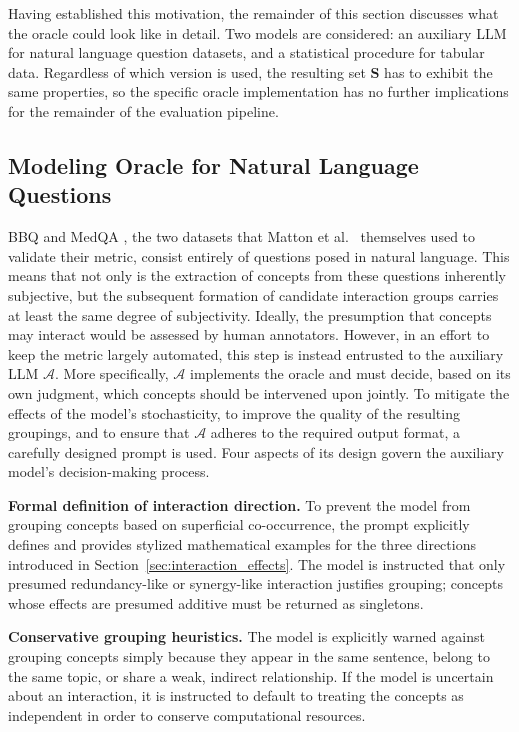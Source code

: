 Having established this motivation, the remainder of this section discusses what the oracle could look like in detail. Two models are considered: an auxiliary LLM for natural language question datasets, and a statistical procedure for tabular data. Regardless of which version is used, the resulting set $\mathbf{S}$ has to exhibit the same properties, so the specific oracle implementation has no further implications for the remainder of the evaluation pipeline.

\subsection{Modeling Oracle for Natural Language Questions}

BBQ \cite{parrishBBQHandbuiltBias2022} and MedQA \cite{jinWhatDiseaseDoes2021}, the two datasets that Matton et al.~\cite{mattonWalkTalkMeasuring2024} themselves used to validate their metric, consist entirely of questions posed in natural language. This means that not only is the extraction of concepts from these questions inherently subjective, but the subsequent formation of candidate interaction groups carries at least the same degree of subjectivity. Ideally, the presumption that concepts may interact would be assessed by human annotators. However, in an effort to keep the metric largely automated, this step is instead entrusted to the auxiliary LLM $\mathcal{A}$. More specifically, $\mathcal{A}$ implements the oracle and must decide, based on its own judgment, which concepts should be intervened upon jointly. To mitigate the effects of the model's stochasticity, to improve the quality of the resulting groupings, and to ensure that $\mathcal{A}$ adheres to the required output format, a carefully designed prompt is used. Four aspects of its design govern the auxiliary model's decision-making process.

\noindent\textbf{Formal definition of interaction direction.} To prevent the model from grouping concepts based on superficial co-occurrence, the prompt explicitly defines and provides stylized mathematical examples for the three directions introduced in Section~\ref{sec:interaction_effects}. The model is instructed that only presumed redundancy-like or synergy-like interaction justifies grouping; concepts whose effects are presumed additive must be returned as singletons.

\noindent\textbf{Conservative grouping heuristics.} The model is explicitly warned against grouping concepts simply because they appear in the same sentence, belong to the same topic, or share a weak, indirect relationship. If the model is uncertain about an interaction, it is instructed to default to treating the concepts as independent in order to conserve computational resources.

